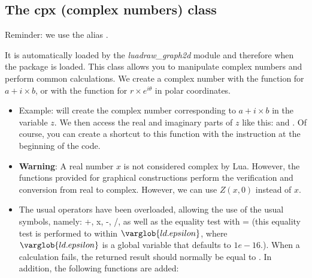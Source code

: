 \subsection{The cpx (complex numbers) class}

Reminder: we use the alias .

It is automatically loaded by the \emph{luadraw\_graph2d} module and therefore when the \luadrawenv package is loaded. This class allows you to manipulate complex numbers and perform common calculations. We create a complex number with the function  for \(a + i\times b\), or with the function  for \(r\times e^{i\theta}\) in polar coordinates.

\begin{itemize}
    \item Example:  will create the complex number corresponding to \(a + i\times b\) in the variable $z$. We then access the real and imaginary parts of $z$ like this:  and . Of course, you can create a shortcut to this function with the instruction  at the beginning of the code.

    \item \textbf{Warning}: A real number $x$ is not considered complex by Lua. However, the functions provided for graphical constructions perform the verification and conversion from real to complex. However, we can use $Z(x,0)$ instead of $x$.

    \item The usual operators have been overloaded, allowing the use of the usual symbols, namely: +, x, -, /, as well as the equality test with = (this equality test is performed to within $\varglob{ld.epsilon}$, where $\varglob{ld.epsilon}$ is a global variable that defaults to $1e-16$.). When a calculation fails, the returned result should normally be equal to \nil.
In addition, the following functions are added:


\end{itemize}

